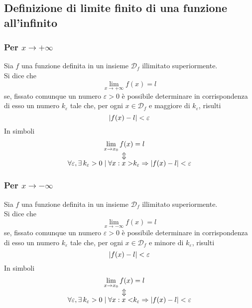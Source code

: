 \subsection{Definizione di limite finito di una funzione all'infinito}
\subsubsection{Per $x\to+\infty$}
\begin{definizioneLimiteInfinitoFinito1}
  Sia $f$ una funzione definita in un insieme $\mathscr{D}_f$ illimitato superiormente.\\
  Si dice che
  \begin{equation*}
    \lim\limits_{x\to+\infty}f(x)=l
  \end{equation*}
  se, fissato comunque un numero $\varepsilon>0$ è possibile determinare in corrispondenza di esso 
  un numero $k_\varepsilon$ tale che, per ogni $x\in\mathscr{D}_f$ e maggiore di $k_\varepsilon$, 
  risulti
  \begin{equation*}
    \lvert f(x)-l\rvert<\varepsilon
  \end{equation*}
  In simboli
  \begin{align*}
    \lim\limits_{x\to x_0} f(x) &= l\\
    \ArrowBetweenLines
    \forall \varepsilon, \exists\,k_\varepsilon>0\mid\forall x: x>&k_\varepsilon \Rightarrow
    \vert f(x) - l\vert < \varepsilon
  \end{align*}
\end{definizioneLimiteInfinitoFinito1}
\subsubsection{Per $x\to-\infty$}
\begin{definizioneLimiteInfinitoFinito2}
  Sia $f$ una funzione definita in un insieme $\mathscr{D}_f$ illimitato superiormente.\\
  Si dice che
  \begin{equation*}
    \lim\limits_{x\to-\infty}f(x)=l
  \end{equation*}
  se, fissato comunque un numero $\varepsilon>0$ è possibile determinare in corrispondenza di esso 
  un numero $k_\varepsilon$ tale che, per ogni $x\in\mathscr{D}_f$ e minore di $k_\varepsilon$, 
  risulti
  \begin{equation*}
    \lvert f(x)-l\rvert<\varepsilon
  \end{equation*}
  In simboli
  \begin{align*}
    \lim\limits_{x\to x_0} f(x) &= l\\
    \ArrowBetweenLines
    \forall \varepsilon, \exists\,k_\varepsilon>0\mid\forall x: x<&k_\varepsilon \Rightarrow
    \vert f(x) - l\vert < \varepsilon
  \end{align*}
\end{definizioneLimiteInfinitoFinito2}

